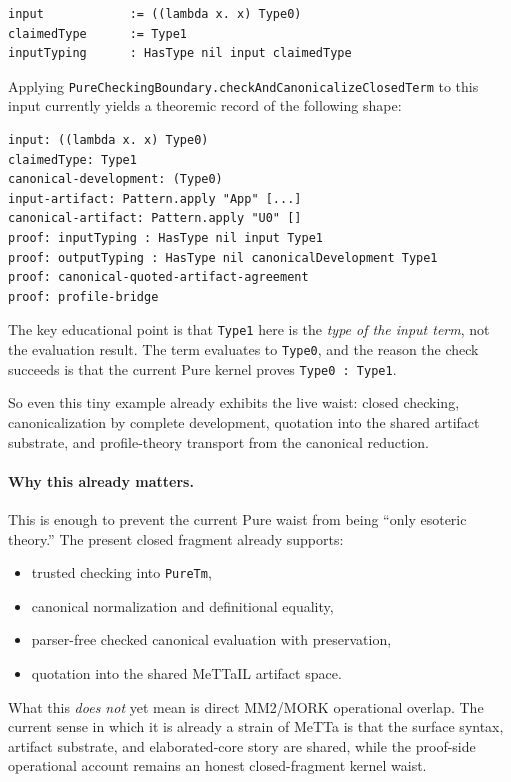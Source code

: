 \documentclass[11pt]{article}
\theoremstyle{remark}
\newcommand{\MeTTa}{\textup{MeTTa}}
\newcommand{\MeTTaIL}{\textup{MeTTaIL}}
\newcommand{\MORK}{\textup{MORK}}
\newcommand{\code}[1]{\texttt{#1}}
\newcommand{\leanref}[1]{\texttt{#1}}
\begin{document}
\begin{lstlisting}
input            := ((lambda x. x) Type0)
claimedType      := Type1
inputTyping      : HasType nil input claimedType
\end{lstlisting}

\noindent
Applying
\leanref{PureCheckingBoundary.checkAndCanonicalizeClosedTerm} to this input
currently yields a theoremic record of the following shape:

\begin{lstlisting}
input: ((lambda x. x) Type0)
claimedType: Type1
canonical-development: (Type0)
input-artifact: Pattern.apply "App" [...]
canonical-artifact: Pattern.apply "U0" []
proof: inputTyping : HasType nil input Type1
proof: outputTyping : HasType nil canonicalDevelopment Type1
proof: canonical-quoted-artifact-agreement
proof: profile-bridge
\end{lstlisting}

\noindent
The key educational point is that \code{Type1} here is the \emph{type of the
input term}, not the evaluation result. The term evaluates to \code{Type0}, and
the reason the check succeeds is that the current Pure kernel proves
\code{Type0 : Type1}.

\medskip
\noindent
So even this tiny example already exhibits the live waist:
closed checking, canonicalization by complete development, quotation into the
shared artifact substrate, and profile-theory transport from the canonical
reduction.

\paragraph{Why this already matters.}
This is enough to prevent the current Pure waist from being ``only esoteric
theory.'' The present closed fragment already supports:
\begin{itemize}[nosep]
  \item trusted checking into \leanref{PureTm},
  \item canonical normalization and definitional equality,
  \item parser-free checked canonical evaluation with preservation,
  \item quotation into the shared \MeTTaIL{} artifact space.
\end{itemize}

\noindent
What this \emph{does not} yet mean is direct MM2/\MORK{} operational overlap.
The current sense in which it is already a strain of \MeTTa{} is that the
surface syntax, artifact substrate, and elaborated-core story are shared, while
the proof-side operational account remains an honest closed-fragment kernel
waist.
\end{document}
